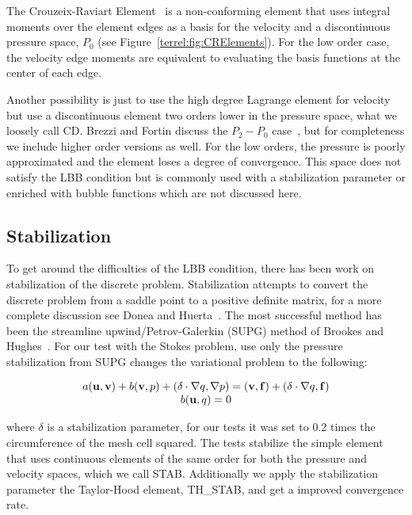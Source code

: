 The Crouzeix-Raviart Element~\cite{CrouzeixRaviart1973} is a non-conforming element that uses
integral moments over the element edges as a basis for the velocity and a
discontinuous pressure space, $P_0$ (see Figure~\ref{terrel:fig:CRElements}).  For the
low order case, the velocity edge moments are equivalent to evaluating the
basis functions at the center of each edge.

Another possibility is just to use the high degree Lagrange element for
velocity but use a discontinuous element two orders lower in the pressure
space, what we loosely call CD.  Brezzi and Fortin discuss the $P_2-P_0$
case~\cite{Brezzi1974aFortin1991}, but for completeness we include higher order versions
as well.  For the low orders, the pressure is poorly approximated and the
element loses a degree of convergence.  This space does not satisfy the LBB
condition but is commonly used with a stabilization parameter or enriched with
bubble functions which are not discussed here.

\subsection{Stabilization}

To get around the difficulties of the LBB condition, there has been work on
stabilization of the discrete problem.  Stabilization attempts to convert the
discrete problem from a saddle point to a positive definite matrix, for a more
complete discussion see Donea and Huerta~\cite{DoneaHuerta2003}.  The most
successful method has been the streamline upwind/Petrov-Galerkin (SUPG) method
of Brookes and Hughes~\cite{BrooksHughes1982}.  For our test with the Stokes problem, use
only the pressure stabilization from SUPG changes the variational problem to the following:

\begin{equation*}
\label{terrel:eqn:StabilizedStokes}
\begin{array}{c}
  a({\bf u},{\bf v})+b({\bf v},p) + (\delta\cdot\nabla{q},\nabla{p})  =  ({\bf v},
  {\bf f}) + (\delta\cdot\nabla{q}, \bf f)\\
  b({\bf u},q) = 0
  \end{array}
\end{equation*}

where $\delta$ is a stabilization parameter, for our tests it was set to 0.2
times the circumference of the mesh cell squared.  The tests stabilize the
simple element that uses continuous elements of the same order for both the
pressure and velocity spaces, which we call STAB.  Additionally we apply the
stabilization parameter the Taylor-Hood element, TH\_STAB, and get a improved convergence
rate.

